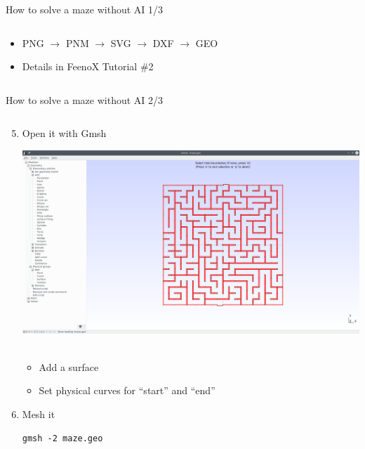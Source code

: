 \documentclass[
  ignorenonframetext,
  aspectratio=169,
]{beamer}
\providecommand{\tightlist}{%
  \setlength{\itemsep}{0pt}\setlength{\parskip}{0pt}}
\begin{document}
\begin{frame}{How to solve a maze without AI 1/3}
\begin{columns}[T]
\begin{column}{0.5\textwidth}
\begin{enumerate}
  \begin{itemize}
  \tightlist
  \item
    PNG \(\rightarrow\) PNM \(\rightarrow\) SVG \(\rightarrow\) DXF
    \(\rightarrow\) GEO
  \item
    Details in FeenoX Tutorial \#2
  \end{itemize}
\end{enumerate}
\end{column}
\end{columns}
\end{frame}

\begin{frame}[fragile]{How to solve a maze without AI 2/3}
\protect\hypertarget{how-to-solve-a-maze-without-ai-23}{}
\begin{columns}[T]
\begin{column}{0.5\textwidth}
\begin{enumerate}
\setcounter{enumi}{4}
\item
  Open it with Gmsh

  \includegraphics{gmsh-maze.png}~

  \begin{itemize}
  \tightlist
  \item
    Add a surface
  \item
    Set physical curves for ``start'' and ``end''
  \end{itemize}
\item
  Mesh it

\begin{lstlisting}[style=terminal]
gmsh -2 maze.geo
\end{lstlisting}
\end{enumerate}
\end{column}


\end{columns}
\end{frame}
\end{document}

